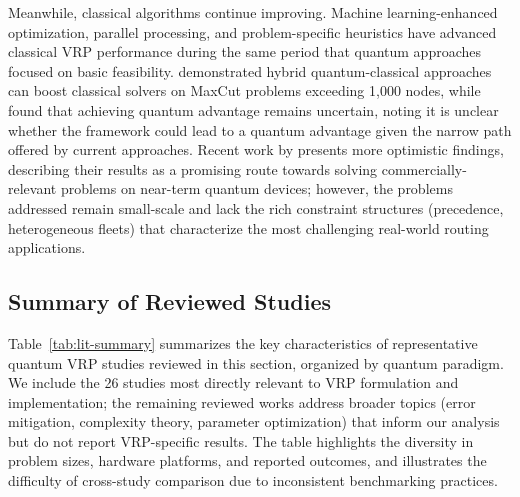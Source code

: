\documentclass[preprint,3p,12pt,authoryear]{elsarticle}
\begin{document}
Meanwhile, classical algorithms continue improving. Machine learning-enhanced optimization, parallel processing, and problem-specific heuristics have advanced classical VRP performance during the same period that quantum approaches focused on basic feasibility. \citet{perelshtein2023nisq} demonstrated hybrid quantum-classical approaches can boost classical solvers on MaxCut problems exceeding 1,000 nodes, while \citet{dupont2025benchmarking} found that achieving quantum advantage remains uncertain, noting it is unclear whether the framework could lead to a quantum advantage given the narrow path offered by current approaches. Recent work by \citet{sciorilli2025towards} presents more optimistic findings, describing their results as a promising route towards solving commercially-relevant problems on near-term quantum devices; {\color{red}however, the problems addressed remain small-scale and lack the rich constraint structures (precedence, heterogeneous fleets) that characterize the most challenging real-world routing applications.}

{\color{red}\subsection{Summary of Reviewed Studies}

Table~\ref{tab:lit-summary} summarizes the key characteristics of representative quantum VRP studies reviewed in this section, organized by quantum paradigm. We include the 26 studies most directly relevant to VRP formulation and implementation; the remaining reviewed works address broader topics (error mitigation, complexity theory, parameter optimization) that inform our analysis but do not report VRP-specific results. The table highlights the diversity in problem sizes, hardware platforms, and reported outcomes, and illustrates the difficulty of cross-study comparison due to inconsistent benchmarking practices.}
\end{document}
